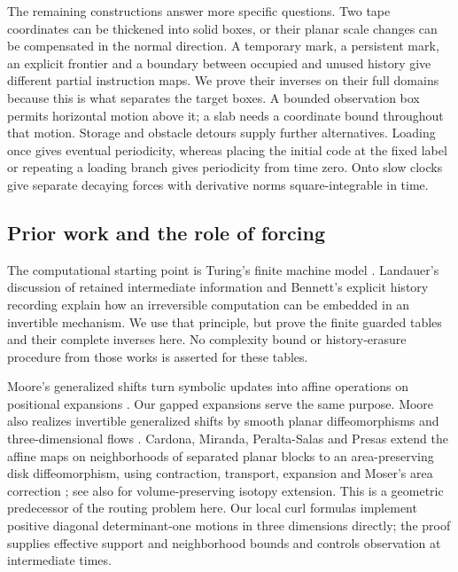 The remaining constructions answer more specific questions. Two tape
coordinates can be thickened into solid boxes, or their planar scale changes
can be compensated in the normal direction. A temporary mark, a persistent
mark, an explicit frontier and a boundary between occupied and unused
history give different partial instruction maps. We prove their inverses
on their full domains because this is what separates the target boxes.
A bounded observation box permits horizontal motion above it; a slab needs
a coordinate bound throughout that motion. Storage and obstacle detours
supply further alternatives. Loading once gives eventual periodicity,
whereas placing the initial code at the fixed label or repeating a loading
branch gives periodicity from time zero. Onto slow clocks give separate
decaying forces with derivative norms square-integrable in time.

\subsection{Prior work and the role of forcing}
The computational starting point is Turing's finite machine model
\cite{Turing1936}. Landauer's discussion of retained intermediate information
\cite[Section~3]{Landauer1961} and Bennett's explicit history recording
\cite[Eqs.~(9)--(11)]{Bennett1973} explain how an irreversible computation
can be embedded in an invertible mechanism. We use that principle, but
prove the finite guarded tables and their complete inverses here. No
complexity bound or history-erasure procedure from those works is asserted
for these tables.

Moore's generalized shifts turn symbolic updates into affine operations
on positional expansions \cite{Moore1990,Moore1991}. Our gapped expansions
serve the same purpose. Moore also realizes invertible generalized shifts
by smooth planar diffeomorphisms and three-dimensional flows
\cite[Section~6, Theorem~12 and its corollary]{Moore1991}.
Cardona, Miranda, Peralta-Salas and Presas extend the affine maps on
neighborhoods of separated planar blocks to an area-preserving disk
diffeomorphism, using contraction, transport, expansion and Moser's area
correction \cite{Moser1965} \cite[Proposition~5.1]{CardonaMirandaPeraltaSalasPresas2021}; see also \cite{Krygin1971} for volume-preserving isotopy extension.
This is a geometric predecessor of the routing problem here. Our local
curl formulas implement positive diagonal determinant-one motions in
three dimensions directly; the proof supplies effective support and
neighborhood bounds and controls observation at intermediate times.

